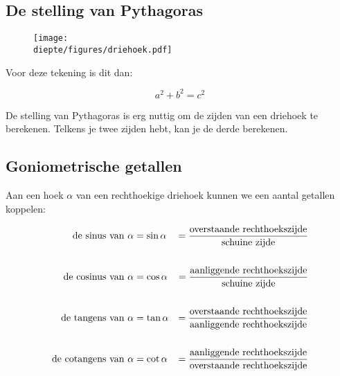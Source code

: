 \documentclass[a4paper,12pt]{article}
\newcommand{\diepte}{./}
\begin{document}
\newpage

\subsection{De stelling van Pythagoras}
\begin{framed}
\begin{center}\end{center}
\end{framed}

\begin{figure}[h]
\begin{center}
\texttt{[image: \\diepte/figures/driehoek.pdf]}
\end{center}
\end{figure}

Voor deze tekening is dit dan:

\begin{framed}
\[a^2+b^2=c^2\]
\end{framed}

De stelling van Pythagoras is erg nuttig om de zijden van een driehoek te berekenen. Telkens je twee zijden hebt, kan je de derde berekenen.

\subsection{Goniometrische getallen}

Aan een hoek $\alpha$ van een rechthoekige driehoek kunnen we een aantal getallen koppelen:
\begin{framed}
\begin{align*}
\textup{de sinus van }\alpha &=\sin \alpha &= \frac{\textup{overstaande rechthoekszijde}}{\textup{schuine zijde}}\\
&&\\
\textup{de cosinus van }\alpha &=\cos \alpha &= \frac{\textup{aanliggende rechthoekszijde}}{\textup{schuine zijde}}\\
&&\\
\textup{de tangens van }\alpha &=\tan \alpha &= \frac{\textup{overstaande rechthoekszijde}}{\textup{aanliggende rechthoekszijde}}\\
&&\\
\textup{de cotangens van }\alpha &=\cot \alpha &= \frac{\textup{aanliggende rechthoekszijde}}{\textup{overstaande rechthoekszijde}}
\end{align*}
\end{framed}
\end{document}
